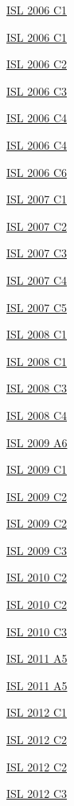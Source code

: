\hyperref  [problem:ISL 2006 C1]{ISL 2006 C1}

\hyperref  [problem:ISL 2006 C1]{ISL 2006 C1}

\hyperref  [problem:ISL 2006 C2]{ISL 2006 C2}

\hyperref  [problem:ISL 2006 C3]{ISL 2006 C3}

\hyperref  [problem:ISL 2006 C4]{ISL 2006 C4}

\hyperref  [problem:ISL 2006 C4]{ISL 2006 C4}

\hyperref  [problem:ISL 2006 C6]{ISL 2006 C6}

\hyperref  [problem:ISL 2007 C1]{ISL 2007 C1}

\hyperref  [problem:ISL 2007 C2]{ISL 2007 C2}

\hyperref  [problem:ISL 2007 C3]{ISL 2007 C3}

\hyperref  [problem:ISL 2007 C4]{ISL 2007 C4}

\hyperref  [problem:ISL 2007 C5]{ISL 2007 C5}

\hyperref  [problem:ISL 2008 C1]{ISL 2008 C1}

\hyperref  [problem:ISL 2008 C1]{ISL 2008 C1}

\hyperref  [problem:ISL 2008 C3]{ISL 2008 C3}

\hyperref  [problem:ISL 2008 C4]{ISL 2008 C4}

\hyperref  [problem:ISL 2009 A6]{ISL 2009 A6}

\hyperref  [problem:ISL 2009 C1]{ISL 2009 C1}

\hyperref  [problem:ISL 2009 C2]{ISL 2009 C2}

\hyperref  [problem:ISL 2009 C2]{ISL 2009 C2}

\hyperref  [problem:ISL 2009 C3]{ISL 2009 C3}

\hyperref  [problem:ISL 2010 C2]{ISL 2010 C2}

\hyperref  [problem:ISL 2010 C2]{ISL 2010 C2}

\hyperref  [problem:ISL 2010 C3]{ISL 2010 C3}

\hyperref  [problem:ISL 2011 A5]{ISL 2011 A5}

\hyperref  [problem:ISL 2011 A5]{ISL 2011 A5}

\hyperref  [problem:ISL 2012 C1]{ISL 2012 C1}

\hyperref  [problem:ISL 2012 C2]{ISL 2012 C2}

\hyperref  [problem:ISL 2012 C2]{ISL 2012 C2}

\hyperref  [problem:ISL 2012 C3]{ISL 2012 C3}

